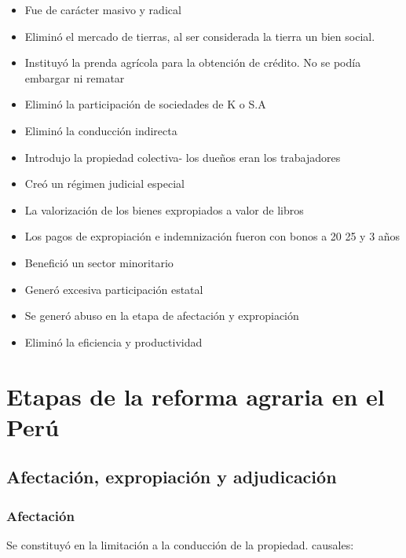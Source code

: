 \documentclass[
  a4paper,
]{article}
\providecommand{\tightlist}{%
  \setlength{\itemsep}{0pt}\setlength{\parskip}{0pt}}\usepackage{longtable,booktabs,array}
\begin{document}
\begin{itemize}
\tightlist
\item
  Fue de carácter masivo y radical
\item
  Eliminó el mercado de tierras, al ser considerada la tierra un bien
  social.
\item
  Instituyó la prenda agrícola para la obtención de crédito. No se podía
  embargar ni rematar
\item
  Eliminó la participación de sociedades de K o S.A
\item
  Eliminó la conducción indirecta
\item
  Introdujo la propiedad colectiva- los dueños eran los trabajadores
\item
  Creó un régimen judicial especial
\item
  La valorización de los bienes expropiados a valor de libros
\item
  Los pagos de expropiación e indemnización fueron con bonos a 20 25 y 3
  años
\item
  Benefició un sector minoritario
\item
  Generó excesiva participación estatal
\item
  Se generó abuso en la etapa de afectación y expropiación
\item
  Eliminó la eficiencia y productividad
\end{itemize}

\hypertarget{etapas-de-la-reforma-agraria-en-el-peruxfa}{%
\section{Etapas de la reforma agraria en el
Perú}\label{etapas-de-la-reforma-agraria-en-el-peruxfa}}

\hypertarget{afectaciuxf3n-expropiaciuxf3n-y-adjudicaciuxf3n}{%
\subsection{Afectación, expropiación y
adjudicación}\label{afectaciuxf3n-expropiaciuxf3n-y-adjudicaciuxf3n}}

\hypertarget{afectaciuxf3n}{%
\subsubsection{Afectación}\label{afectaciuxf3n}}

Se constituyó en la limitación a la conducción de la propiedad.
causales:
\end{document}
